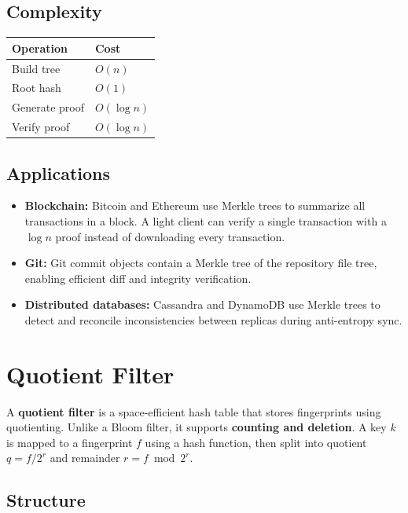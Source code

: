 \subsection{Complexity}

\begin{center}
\begin{tabular}{ll}
\toprule
Operation & Cost \\
\midrule
Build tree & $O(n)$ \\
Root hash & $O(1)$ \\
Generate proof & $O(\log n)$ \\
Verify proof & $O(\log n)$ \\
\bottomrule
\end{tabular}
\end{center}

\subsection{Applications}

\begin{itemize}
    \item \textbf{Blockchain:} Bitcoin and Ethereum use Merkle trees to summarize all transactions in a block. A light client can verify a single transaction with a $\log n$ proof instead of downloading every transaction.
    \item \textbf{Git:} Git commit objects contain a Merkle tree of the repository file tree, enabling efficient diff and integrity verification.
    \item \textbf{Distributed databases:} Cassandra and DynamoDB use Merkle trees to detect and reconcile inconsistencies between replicas during anti-entropy sync.
\end{itemize}

\section{Quotient Filter}

A \textbf{quotient filter} is a space-efficient hash table that stores fingerprints using quotienting. Unlike a Bloom filter, it supports \textbf{counting and deletion}. A key $k$ is mapped to a fingerprint $f$ using a hash function, then split into quotient $q = f / 2^r$ and remainder $r = f \bmod 2^r$.

\subsection{Structure}

